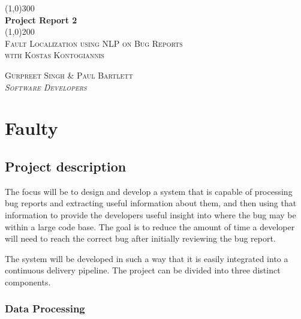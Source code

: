 \documentclass[11pt,]{article}
\begin{document}
\doublespacing

\begin{titlepage}
    \begin{center}
    \line(1,0){300} \\ 
    [0.25in]
    \huge{\bfseries Project Report 2} \\
    [2mm]
    \line(1,0){200} \\
    [1.5cm] 
    \textsc{\Large Fault Localization using NLP on Bug Reports} \\
    [0.75cm]
    \textsc{\Large with Kostas Kontogiannis} \\
    [10cm]
    \end{center}
    
    \begin{flushright}
    \textsc{\Large{Gurpreet Singh \& Paul Bartlett \\} \normalsize\emph{Software Developers \\} }
    
    \end{flushright}
    
\end{titlepage}


\newpage

{
\hypersetup{linkcolor=black}
\setcounter{tocdepth}{2}
\tableofcontents
\newpage
}
\hypertarget{faulty}{%
\section{Faulty}\label{faulty}}

\hypertarget{project-description}{%
\subsection{Project description}\label{project-description}}

The focus will be to design and develop a system that is capable of
processing bug reports and extracting useful information about them, and
then using that information to provide the developers useful insight
into where the bug may be within a large code base. The goal is to
reduce the amount of time a developer will need to reach the correct bug
after initially reviewing the bug report.

The system will be developed in such a way that it is easily integrated
into a continuous delivery pipeline. The project can be divided into
three distinct components.

\hypertarget{data-processing}{%
\subsubsection{Data Processing}\label{data-processing}}
\end{document}
